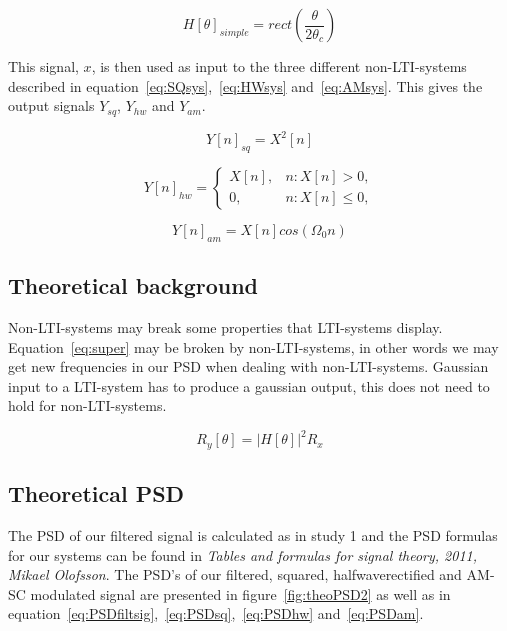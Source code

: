\documentclass[10pt]{article}
\begin{document}
\begin{equation}
  \label{eq:idealH2}
  H[\theta]_{simple} =rect(\frac{\theta} {2\theta_c})
\end{equation}

This signal, $x$, is then used as input to the three different non-LTI-systems
described in equation~\ref{eq:SQsys},~\ref{eq:HWsys} and~\ref{eq:AMsys}.
This gives the output signals $Y_{sq}$, $Y_{hw}$ and $Y_{am}$.

\begin{equation}
  \label{eq:SQsys}
  Y[n]_{sq} =X^2[n]
\end{equation}

\begin{equation}
  \label{eq:HWsys}
  Y[n]_{hw} =
\begin{cases}
   X[n],& n: X[n]>0,\\
    0,    & n: X[n] \leq 0,
\end{cases}
\end{equation}


\begin{equation}
  \label{eq:AMsys}
  Y[n]_{am} =X[n]cos(\Omega_{0}n)
\end{equation}

\subsection{Theoretical background}

Non-LTI-systems may break some properties that LTI-systems display.
Equation~\ref{eq:super} may be broken by non-LTI-systems, in other words we may
get new frequencies in our PSD when dealing with non-LTI-systems.
Gaussian input to a LTI-system has to produce a gaussian output, this does not
need to hold for non-LTI-systems.

\begin{equation}
  \label{eq:super}
  R_y[\theta] =|H[\theta]|^2R_x
\end{equation}


\subsection{Theoretical PSD}
The PSD of our filtered signal is calculated as in study 1 and the PSD formulas for our systems can be found in  \emph{Tables and formulas for signal theory, 2011, Mikael Olofsson}. The PSD's of our filtered, squared, halfwaverectified and AM-SC modulated signal
are presented in figure~\ref{fig:theoPSD2} as well as in equation~\ref{eq:PSDfiltsig},~\ref{eq:PSDsq},~\ref{eq:PSDhw}
and~\ref{eq:PSDam}.
\end{document}
